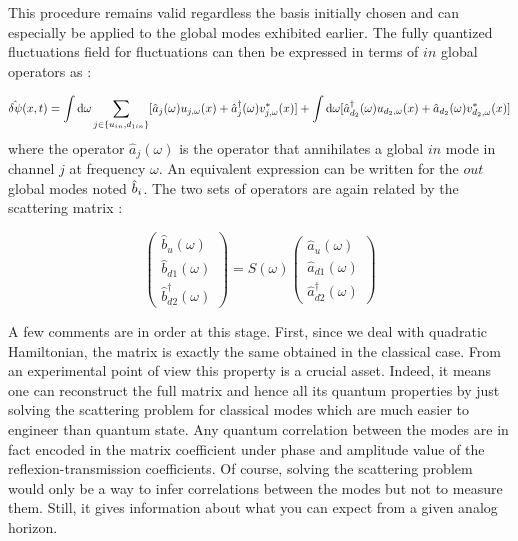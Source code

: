 This procedure remains valid regardless the basis initially chosen and can especially be applied to the global modes exhibited earlier. The fully quantized fluctuations field for fluctuations can then be expressed in terms of $in$ global operators as :

\begin{equation}
    \hat{\delta\psi}(x,t) = \int \mathrm{d}\omega\sum_{j\in \{u_{in},d_{1in}\} }[\hat{a}_j(\omega)u_{j,\omega}(x)+\hat{a}^\dagger_j(\omega)v^*_{j,\omega}(x)] + \int \mathrm{d}\omega[\hat{a}^\dagger_{d_2}(\omega)u_{d_2,\omega}(x)+\hat{a}_{d_2}(\omega)v^*_{d_2,\omega}(x)]
    \label{eq:fluctuation_quantization}
\end{equation}
where the operator $\hat{a}_j(\omega)$ is the operator that annihilates a global $in$ mode in channel $j$ at frequency $\omega$. An equivalent
expression can be written for the $out$ global modes noted $\hat{b}_i$. The two sets of operators are again related by the scattering matrix :

\begin{equation}
    \begin{pmatrix}
        \hat{b}_u(\omega) \\
        \hat{b}_{d1}(\omega) \\
        \hat{b}_{d2}^\dagger(\omega)
    \end{pmatrix}=S(\omega)\begin{pmatrix}
        \hat{a}_u(\omega) \\
        \hat{a}_{d1}(\omega) \\
        \hat{a}_{d2}^\dagger(\omega)    
    \end{pmatrix}
\end{equation}


A few comments are in order at this stage. First, since we deal with quadratic Hamiltonian, the matrix is exactly the same obtained in the classical case.
From an experimental point of view this property is a crucial asset. Indeed, it means one can reconstruct the full matrix and hence all its quantum 
properties by just solving the scattering problem for classical modes which are much easier to engineer than quantum state. Any quantum correlation between the modes are in fact encoded in the matrix coefficient 
under phase and amplitude value of the reflexion-transmission coefficients. Of course, solving the scattering problem
would only be a way to infer correlations between the modes but not to measure them. Still, it gives information about what you can expect from a given 
analog horizon.

